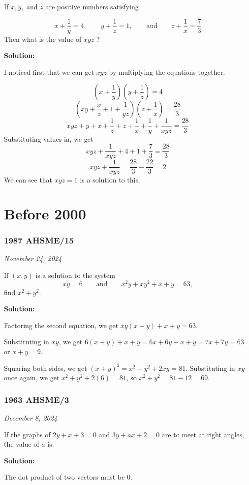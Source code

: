 \documentclass[../mathproblems.tex]{subfiles}
\begin{document}
If $x,y,$ and $z$ are positive numbers satisfying

\[x + \frac{1}{y} = 4,\qquad y + \frac{1}{z} = 1, \qquad \text{and} \qquad z + \frac{1}{x} = \frac{7}{3}\]
Then what is the value of $xyz$ ?

\textbf{Solution:}

I noticed first that we can get $xyz$ by multiplying the equations together.

\[ \left(x+\frac{1}{y}\right) \left(y+\frac{1}{z}\right) = 4 \]\[ \left(xy + \frac{x}{z}+1+\frac{1}{yz}\right)\left(z+\frac{1}{x}\right) = \frac{28}{3} \]\[ xyz + y + x + \frac{1}{z} + z + \frac{1}{x} + \frac{1}{y} + \frac{1}{xyz} = \frac{28}{3} \]
Substituting values in, we get
\[ xyz + \frac{1}{xyz} + 4 + 1 + \frac{7}{3} = \frac{28}{3} \]\[ xyz + \frac{1}{xyz} = \frac{28}{3} - \frac{22}{3} = 2 \]
We can see that $\boxed{xyz=1}$ is a solution to this.

\noindent\hrulefill
\section{Before 2000}
\subsubsection*{1987 AHSME/15} 
\textit{November 24, 2024}

If $(x, y)$ is a solution to the system
\[ xy=6 \qquad \text{and} \qquad x^2y+xy^2+x+y=63, \]find $x^2+y^2.$

\textbf{Solution:}

Factoring the second equation, we get $xy(x+y)+x+y=63$.

Substituting in $xy$, we get $6(x+y)+x+y = 6x+6y+x+y = 7x+7y = 63$ or $x+y=9$.

Squaring both sides, we get $(x+y)^2 = x^2+y^2+2xy = 81$. Substituting in $xy$ once again, we get $x^2+y^2+2(6)=81$, so $x^2+y^2=81-12=69$.

\noindent\hrulefill

\subsubsection*{1963 AHSME/3}
\textit{December 8, 2024}

If the graphs of $2y+x+3=0$ and $3y+ax+2=0$ are to meet at right angles, the value of $a$ is:

\textbf{Solution:}

The dot product of two vectors must be $0$.
\end{document}
